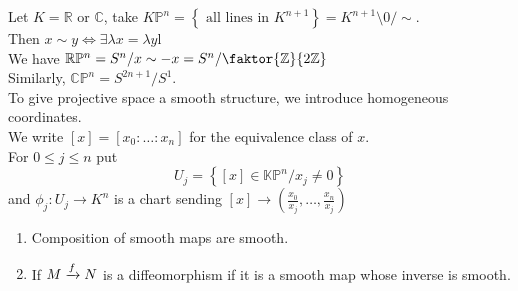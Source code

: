 \documentclass[../main.tex]{subfiles}
\begin{document}
\begin{exemple}
Let $K= \mathbb{R}$ or $\mathbb{C}$, take $K\mathbb{P}^{n}= \left\{ \text{ all lines in  } K^{n+1} \right\} = K^{n+1}\setminus 0 / \sim$.\\
Then  $x\sim y \iff \exists \lambda x= \lambda y$l\\
We have $\mathbb{R}\mathbb{P}^{n}= S^{n} / x \sim -x = S^{n} / \faktor{\mathbb{Z}}{2 \mathbb{Z}}$ \\
Similarly, $ \mathbb{C}\mathbb{P}^{n} = S^{2n+1}/ S^{1}$.\\
To give projective space a smooth structure, we introduce homogeneous coordinates.\\
We write $[x] = [ x_0: \ldots:x_n] $ for the equivalence class of $x$.\\
For $0 \leq j \leq n$ put
\[ 
U_j = \left\{ [ x] \in \mathbb{K}\mathbb{P}^{n} / x_j \neq 0 \right\} 
\]
and $\phi_j: U_j \to K^{n}$ is a chart sending $[x] \to ( \frac{x_0}{x_j},\ldots, \frac{x_n}{x_j }) $ 
\end{exemple}
\begin{rmq}
\begin{enumerate}
\item Composition of smooth maps are smooth.
\item If $M\xrightarrow{f} N$ is a diffeomorphism if it is a smooth map whose inverse is smooth.
\end{enumerate}
\end{rmq}
\end{document}
